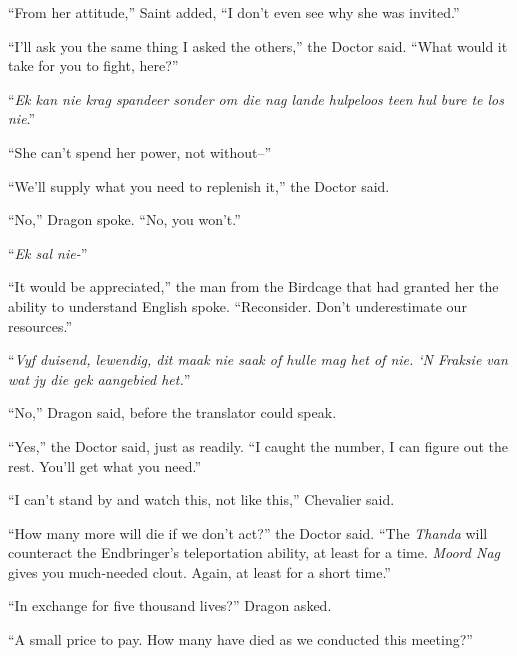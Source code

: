 ``From her attitude,'' Saint added, ``I don't even see why she was invited.''



``I'll ask you the same thing I asked the others,'' the Doctor said.  ``What would it take for you to fight, here?''



``\emph{Ek kan nie krag spandeer sonder om die nag lande hulpeloos teen hul bure te los nie}.''



``She can't spend her power, not without--''



``We'll supply what you need to replenish it,'' the Doctor said.



``No,'' Dragon spoke.  ``No, you won't.''



``\emph{Ek sal nie-}''



``It would be appreciated,'' the man from the Birdcage that had granted her the ability to understand English spoke.  ``Reconsider.  Don't underestimate our resources.''



``\emph{Vyf duisend, lewendig, dit maak nie saak of hulle mag het of nie.  `N Fraksie van wat jy die gek aangebied het.}''



``No,'' Dragon said, before the translator could speak.



``Yes,'' the Doctor said, just as readily.  ``I caught the number, I can figure out the rest.  You'll get what you need.''



``I can't stand by and watch this, not like this,'' Chevalier said.



``How many more will die if we don't act?'' the Doctor said.  ``The \emph{Thanda }will counteract the Endbringer's teleportation ability, at least for a time.  \emph{Moord Nag} gives you much-needed clout.  Again, at least for a short time.''



``In exchange for five thousand lives?'' Dragon asked.



``A small price to pay.  How many have died as we conducted this meeting?''




